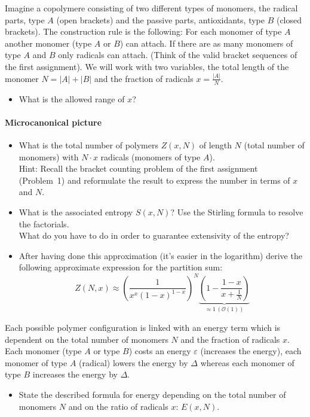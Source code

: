 \documentclass[12pt,a4paper]{article} %
\begin{document}
Imagine a copolymere consisting of two different types of monomers, the radical parts, type $A$ (open brackets) and the passive parts, antioxidants, type $B$ (closed brackets).
The construction rule is the following: For each monomer of type $A$ another monomer (type $A$ or $B$) can attach. If there are as many monomers of type $A$ and $B$ only radicals can attach. (Think of the valid bracket sequences of the first assignment). 
We will work with two variables, the total length of the monomer $N = |A|+|B|$ and the fraction of radicals $x = \frac{|A|}{N}$.
\begin{itemize}
 \item What is the allowed range of $x$?
\end{itemize}

\paragraph{Microcanonical picture}
\begin{itemize}
 \item What is the total number of polymers $Z(x,N)$ of length $N$ (total number of monomers) with $N\cdot x$ radicals (monomers of type $A$).\\
Hint: Recall the bracket counting problem of the first assignment (Problem~1) and reformulate the result to express the number in terms of $x$ and $N$.
\item What is the associated entropy $S(x,N)$? Use the Stirling formula to resolve the factorials.\\
What do you have to do in order to guarantee extensivity of the entropy?
\item After having done this approximation (it's easier in the logarithm) derive the following approximate expression for the partition sum: $$Z(N,x) \approx  \left(\frac{1}{x^x (1-x)^{1-x}}\right)^N \underbrace{\left(1 - \frac{1-x}{x+\frac{1}{N}}\right)}_{\approx 1 \,(\mathcal{O}(1))}$$
\end{itemize}

Each possible polymer configuration is linked with an energy term which is dependent on the total number of monomers $N$ and the fraction of radicals $x$. Each monomer (type $A$ or type $B$) costs an energy $\varepsilon$ (increases the energy), each monomer of type $A$ (radical) lowers the energy by $\Delta$ whereas each monomer of type $B$ increases the energy by $\Delta$. 
\begin{itemize}
 \item State the described formula for energy depending on the total number of monomers $N$ and on the ratio of radicals $x$: $E(x,N)$.
\end{itemize}
\end{document}
